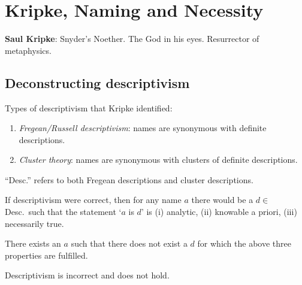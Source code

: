 \chapter{Kripke, Naming and Necessity}

\textbf{Saul Kripke}: Snyder's Noether. The God in his eyes. Resurrector of metaphysics.

\section{Deconstructing descriptivism}

Types of descriptivism that Kripke identified:

\begin{definition}\leavevmode
\begin{enumerate}[label=\roman*.]
  \item \emph{Fregean/Russell descriptivism}: names are synonymous with definite descriptions.
  \item \emph{Cluster theory}: names are synonymous with clusters of definite descriptions.
\end{enumerate}
\end{definition}

\begin{argument}
``Desc.'' refers to both Fregean descriptions and cluster descriptions.
\begin{premises}
  \item[P1)] If descriptivism were correct, then for any name $a$ there would be a $d \in$ Desc.\ such that the statement `$a$ is $d$' is (i) analytic, (ii) knowable a priori, (iii) necessarily true.
  \item[P2)] There exists an $a$ such that there does not exist a $d$ for which the above three properties are fulfilled.
  \item[C)] Descriptivism is incorrect and does not hold.
\end{premises}
\end{argument}

